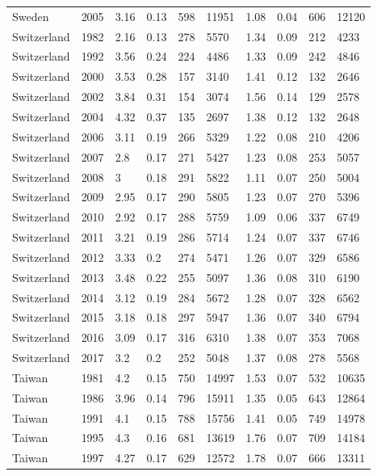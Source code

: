 \begin{tabular}{llllllllll}
Sweden & 2005 & 3.16 & 0.13 & 598 & 11951 & 1.08 & 0.04 & 606 & 12120 \\ 
Switzerland & 1982 & 2.16 & 0.13 & 278 & 5570 & 1.34 & 0.09 & 212 & 4233 \\ 
Switzerland & 1992 & 3.56 & 0.24 & 224 & 4486 & 1.33 & 0.09 & 242 & 4846 \\ 
Switzerland & 2000 & 3.53 & 0.28 & 157 & 3140 & 1.41 & 0.12 & 132 & 2646 \\ 
Switzerland & 2002 & 3.84 & 0.31 & 154 & 3074 & 1.56 & 0.14 & 129 & 2578 \\ 
Switzerland & 2004 & 4.32 & 0.37 & 135 & 2697 & 1.38 & 0.12 & 132 & 2648 \\ 
Switzerland & 2006 & 3.11 & 0.19 & 266 & 5329 & 1.22 & 0.08 & 210 & 4206 \\ 
Switzerland & 2007 & 2.8 & 0.17 & 271 & 5427 & 1.23 & 0.08 & 253 & 5057 \\ 
Switzerland & 2008 & 3 & 0.18 & 291 & 5822 & 1.11 & 0.07 & 250 & 5004 \\ 
Switzerland & 2009 & 2.95 & 0.17 & 290 & 5805 & 1.23 & 0.07 & 270 & 5396 \\ 
Switzerland & 2010 & 2.92 & 0.17 & 288 & 5759 & 1.09 & 0.06 & 337 & 6749 \\ 
Switzerland & 2011 & 3.21 & 0.19 & 286 & 5714 & 1.24 & 0.07 & 337 & 6746 \\ 
Switzerland & 2012 & 3.33 & 0.2 & 274 & 5471 & 1.26 & 0.07 & 329 & 6586 \\ 
Switzerland & 2013 & 3.48 & 0.22 & 255 & 5097 & 1.36 & 0.08 & 310 & 6190 \\ 
Switzerland & 2014 & 3.12 & 0.19 & 284 & 5672 & 1.28 & 0.07 & 328 & 6562 \\ 
Switzerland & 2015 & 3.18 & 0.18 & 297 & 5947 & 1.36 & 0.07 & 340 & 6794 \\ 
Switzerland & 2016 & 3.09 & 0.17 & 316 & 6310 & 1.38 & 0.07 & 353 & 7068 \\ 
Switzerland & 2017 & 3.2 & 0.2 & 252 & 5048 & 1.37 & 0.08 & 278 & 5568 \\ 
Taiwan & 1981 & 4.2 & 0.15 & 750 & 14997 & 1.53 & 0.07 & 532 & 10635 \\ 
Taiwan & 1986 & 3.96 & 0.14 & 796 & 15911 & 1.35 & 0.05 & 643 & 12864 \\ 
Taiwan & 1991 & 4.1 & 0.15 & 788 & 15756 & 1.41 & 0.05 & 749 & 14978 \\ 
Taiwan & 1995 & 4.3 & 0.16 & 681 & 13619 & 1.76 & 0.07 & 709 & 14184 \\ 
Taiwan & 1997 & 4.27 & 0.17 & 629 & 12572 & 1.78 & 0.07 & 666 & 13311 \\ 

\end{tabular}
